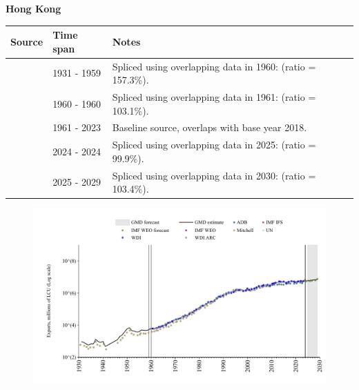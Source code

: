 \documentclass[12pt,a4paper,landscape]{article}
\begin{document}
\begin{adjustbox}{max totalsize={\paperwidth}{\paperheight},center}
\begin{minipage}[t][\textheight][t]{\textwidth}
\vspace*{0.5cm}
{}
\begin{center}
{\Large\bfseries Hong Kong}
\end{center}
\vspace{0.5cm}
\begin{table}[H]
\centering
\small
\begin{tabular}{|l|l|l|}
\hline
\textbf{Source} & \textbf{Time span} & \textbf{Notes} \\
\hline
\rowcolor{white}\cite{Mitchell}& 1931 - 1959 &Spliced using overlapping data in 1960: (ratio = 157.3\%).\\
\rowcolor{lightgray}\cite{WDI_ARC}& 1960 - 1960 &Spliced using overlapping data in 1961: (ratio = 103.1\%).\\
\rowcolor{white}\cite{WDI}& 1961 - 2023 &Baseline source, overlaps with base year 2018.\\
\rowcolor{lightgray}\cite{IMF_IFS}& 2024 - 2024 &Spliced using overlapping data in 2025: (ratio = 99.9\%).\\
\rowcolor{white}\cite{IMF_WEO_forecast}& 2025 - 2029 &Spliced using overlapping data in 2030: (ratio = 103.4\%).\\
\hline
\end{tabular}
\end{table}
\begin{figure}[H]
\centering
\includegraphics[width=\textwidth,height=0.6\textheight,keepaspectratio]{graphs/HKG_exports.pdf}
\end{figure}
\end{minipage}
\end{adjustbox}
\end{document}
